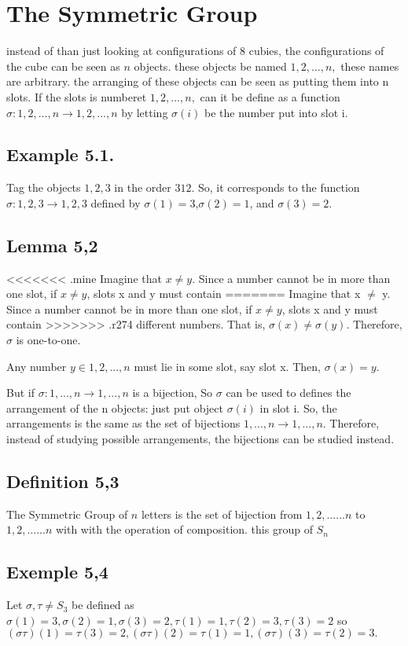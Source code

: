 \section{The Symmetric Group}

instead of than just looking at configurations of 8 cubies, the configurations of the cube can be seen as $n$ objects. 
these objects be named $1, 2, . . . , n,$ these names are arbitrary. the arranging of these objects can be seen as
putting them into n slots. If the slots is numberet $1, 2, . . . , n,$ can it be define as a function $\sigma : {1, 2, . . . , n} \rightarrow
{1, 2, . . . , n}$ by letting $\sigma(i)$ be the number put into slot i.

\subsection{Example 5.1.} 
Tag the objects $1, 2, 3$ in the order $3 1 2$. So, it corresponds to the function $\sigma: {1, 2, 3} \rightarrow {1, 2, 3}$
defined by $\sigma(1) = 3$,$\sigma(2) = 1$, and $\sigma(3) = 2$.

\subsection{Lemma 5,2}
<<<<<<< .mine
Imagine that $x\neq y$. Since a number cannot be in more than one slot, if $x \neq y$, slots x and y must contain
=======
Imagine that x $\neq$ y. Since a number cannot be in more than one slot, if $x \neq y$, slots x and y must contain
>>>>>>> .r274
different numbers. That is, $\sigma(x) \neq \sigma(y)$. Therefore, $\sigma$ is one-to-one.

Any number $y \in {1, 2, . . . , n}$ must lie in some slot, say slot x. Then, $\sigma(x) = y$.

But if $\sigma: {1, . . . , n} \rightarrow {1, . . . , n}$ is a bijection, So $\sigma$ can be used to defines the arrangement of the n
objects: just put object $\sigma(i)$ in slot i. So, the arrangements is the same as the set of
bijections ${1, . . . , n} \rightarrow {1, . . . , n}$. Therefore, instead of studying possible arrangements, the bijections can be studied instead.

\subsection{Definition 5,3}

The Symmetric Group of $n$ letters is the set of bijection from ${1,2,......n}$ to ${1,2,......n}$ with with the operation of composition.
this group of $S_n$

\subsection{Exemple 5,4}

Let $\sigma,\tau \neq S_3$ be defined as $\sigma(1)=3, \sigma(2)=1, \sigma(3)=2, \tau(1)=1,\tau(2)=3,\tau(3)=2$ so $(\sigma\tau)(1)=\tau(3)=2,(\sigma\tau)(2)=\tau(1)=1, (\sigma\tau)(3)=\tau(2)=3.$




\myTail{
}
%